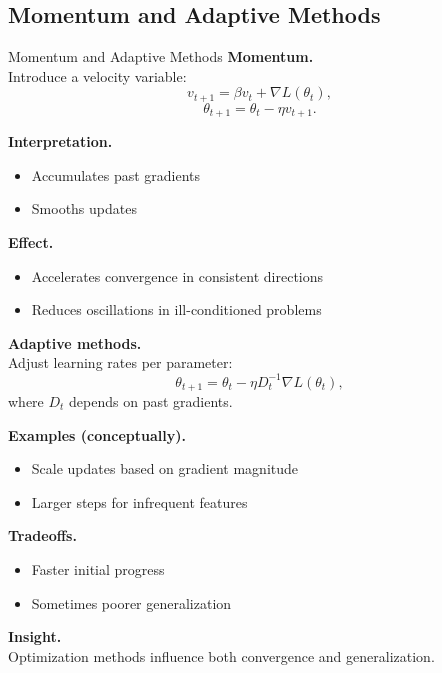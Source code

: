 \documentclass[aspectratio=169,11pt]{beamer}
\begin{document}
\subsection{Momentum and Adaptive Methods}
\begin{frame}[t,allowframebreaks]{Momentum and Adaptive Methods}
\small
\textbf{Momentum.}\\ Introduce a velocity variable:
\[
v_{t+1} = \beta v_t + \nabla L(\theta_t),
\]
\[
\theta_{t+1} = \theta_t - \eta v_{t+1}.
\]

\textbf{Interpretation.}\\ \begin{itemize}
    \item Accumulates past gradients
    \item Smooths updates
\end{itemize}

\textbf{Effect.}\\ \begin{itemize}
    \item Accelerates convergence in consistent directions
    \item Reduces oscillations in ill-conditioned problems
\end{itemize}

\textbf{Adaptive methods.}\\ Adjust learning rates per parameter:
\[
\theta_{t+1} = \theta_t - \eta D_t^{-1} \nabla L(\theta_t),
\]
where $D_t$ depends on past gradients.

\textbf{Examples (conceptually).}\\ \begin{itemize}
    \item Scale updates based on gradient magnitude
    \item Larger steps for infrequent features
\end{itemize}

\textbf{Tradeoffs.}\\ \begin{itemize}
    \item Faster initial progress
    \item Sometimes poorer generalization
\end{itemize}

\textbf{Insight.}\\ Optimization methods influence both convergence and generalization.
\end{frame}
\end{document}

